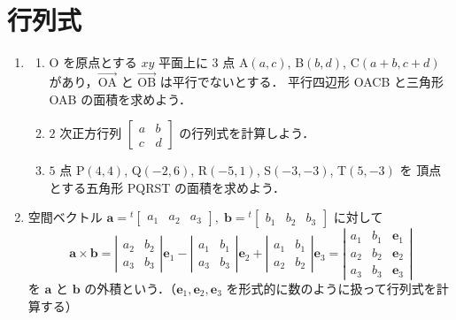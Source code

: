 \documentclass[11pt, uplatex, dvipdfmx]{jsarticle}
\renewcommand*{\vec}[1]{\overrightarrow{\textrm{#1}}}
\begin{document}
\newpage

\section{行列式}\label{sec:determinant}

\begin{enumerate}
  \setlength{\itemsep}{1zh}
  
\item 

  \begin{enumerate}[(1)]
    \setlength{\itemsep}{1ex}
    
  \item O を原点とする $xy$ 平面上に $3$ 点 A$(a,c)$, B$(b,d)$,
    C$(a+b, c+d)$ があり，$\vec{OA}$ と $\vec{OB}$ は平行でないとする．
    平行四辺形 OACB と三角形 OAB の面積を求めよう．

  \item $2$ 次正方行列 $\left[
      \begin{array}{cc}
        a & b\\
        c & d
      \end{array}
    \right]$ の行列式を計算しよう．

  \item $5$ 点 P$(4,4)$, Q$(-2,6)$, R$(-5,1)$, S$(-3,-3)$, T$(5,-3)$ を
    頂点とする五角形 PQRST の面積を求めよう．
  \end{enumerate}

\item 空間ベクトル $\bm{a} = {}^{t}\left[
    \begin{array}{ccc}
      a_1 & a_2 & a_3
    \end{array}
  \right], \; \bm{b}=  {}^{t}\left[
    \begin{array}{ccc}
      b_1 & b_2 & b_3
    \end{array}
  \right]$ に対して
  \[
    \bm{a} \times \bm{b} = \left|
      \begin{array}{cc}
        a_2 & b_2\\
        a_3 & b_3
      \end{array}
    \right| \bm{e}_1 -\left|
      \begin{array}{cc}
        a_1 & b_1\\
        a_3 & b_3
      \end{array}
    \right|\bm{e}_2 + \left|
      \begin{array}{cc}
        a_1 & b_1\\
        a_2 & b_2
      \end{array}
    \right| \bm{e}_3 = \left|
      \begin{array}{ccc}
        a_1 & b_1 & \bm{e}_1\\
        a_2 & b_2 & \bm{e}_2\\
        a_3 & b_3 & \bm{e}_3
      \end{array}
    \right|
  \]
  を $\bm{a}$ と $\bm{b}$ の外積という．（$\bm{e}_1, \bm{e}_2,
  \bm{e}_3$ を形式的に数のように扱って行列式を計算する）


\end{enumerate}
\end{document}
